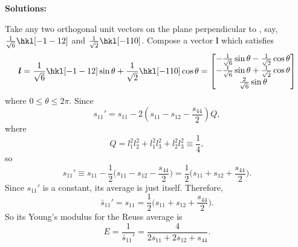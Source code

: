 \documentclass[12pt]{article}
\begin{document}
\textbf{Solutions:}

Take any two orthogonal unit vectors on the plane perpendicular to \hkl[1 1 1],
say, $\frac{ 1 }{ \sqrt{6} }\hkl[-1 -1 2]$ and $\frac{ 1 }{ \sqrt{2} }\hkl[-1 1 0]$.
Compose a vector $\bm{l}$ which satisfies
\begin{equation}
  \bm{l} = \frac{ 1 }{ \sqrt{6} } \hkl[-1 -1 2] \sin \theta + \frac{ 1 }{ \sqrt{2} } \hkl[-1 1 0] \cos \theta =
  \begin{bmatrix}
    -\frac{ 1 }{ \sqrt{6} } \sin \theta - \frac{ 1 }{ \sqrt{2} } \cos \theta \\
    -\frac{ 1 }{ \sqrt{6} } \sin \theta + \frac{ 1 }{ \sqrt{2} } \cos \theta \\
    \frac{ 2 }{ \sqrt{6} } \sin \theta
  \end{bmatrix}
\end{equation}
where $0 \leq \theta \leq 2 \pi$.
Since
\begin{equation}
  s_{11}' = s_{11} - 2(s_{11} - s_{12} - \frac{ s_{44} }{ 2 }) Q,
\end{equation}
where
\begin{equation}
  Q = l_1^2 l_2^2 + l_1^2 l_3^2 + l_2^2 l_3^2 \equiv \frac{ 1 }{ 4 },
\end{equation}
so
\begin{equation}
  s_{11}' \equiv s_{11} - \frac{ 1 }{ 2 } \Big(s_{11} - s_{12} - \frac{ s_{44} }{ 2 }\Big)
  = \frac{ 1 }{ 2 } \Big(s_{11} + s_{12} + \frac{ s_{44} }{ 2 }\Big).
\end{equation}
Since $s_{11}'$ is a constant, its average is just itself. Therefore,
\begin{equation}
  \bar{s}_{11}' = s_{11} = \frac{ 1 }{ 2 } \Big(s_{11} + s_{12} + \frac{ s_{44} }{ 2 }\Big).
\end{equation}
So its Young's modulus for the Reuss average is
\begin{equation}
  E = \frac{ 1 }{ \bar{s}_{11}' } = \frac{4}{2 s_{11} + 2 s_{12} + s_{44} }.
\end{equation}

% 
% 

\end{document}
